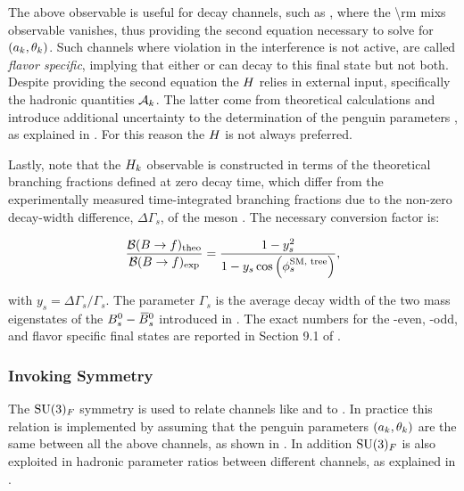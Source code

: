 \noindent The above observable is useful for decay channels, such as \BsJpsiKst, where the \Acp{\rm mix} observable vanishes,
thus providing the second equation necessary to solve for $(a_k,\theta_k)$. Such channels
where \CP violation in the interference is not active, are called {\it flavor specific}, implying
that either \Bs or \Bsb can decay to this final state but not both.
Despite providing the second equation the $H_{}$ relies in external input, specifically the hadronic quantities $\mathcal{A}_{k}$.
The latter come from theoretical calculations and introduce additional uncertainty to the determination of the penguin parameters
, as explained in . For this reason the $H_{}$ is not always preferred.

Lastly, note that the $H_{k}$ observable is constructed in terms of the theoretical branching fractions
defined at zero decay time, which differ from the experimentally measured time-integrated branching fractions \cite{DeBruyn:2012wj}
due to the non-zero decay-width difference, $\Delta\Gamma_s$, of the \Bs meson \cite{hfag-2014}.
The necessary conversion factor is:

\begin{equation}
  \centering
  \frac{\BRof{\B\to f}_{\rm theo}}{\BRof{\B\to f}_{\rm exp}} = \frac{1-y_s^2}{1-y_s\cos\parenthesis{\phiS{\rm SM, tree}}},
  \label{br_conversion_formula}
\end{equation}

\noindent with $y_s = \Delta\Gamma_s / \Gamma_s$. The parameter $\Gamma_s$ is the average decay width of the two
mass eigenstates of the $B^0_s-\kern 0.18em\overline{\kern -0.18em B}{}^0_s$ introduced in . The exact numbers for the \CP-even,
\CP-odd, and flavor specific final states are reported in Section 9.1 of \cite{bsjpsikst-paper}.

\subsubsection{Invoking \grpsuthree Symmetry}
The $\mathrm{SU}(3)_{F}$ symmetry is used to relate channels like \BsJpsiKst and \BsJpsiRho to \BsJpsiPhi.
In practice this relation is implemented by assuming that the penguin parameters $(a_k,\theta_k)$
are the same between all the above channels, as shown in . In addition $\mathrm{SU}(3)_{F}$
is also exploited in hadronic parameter ratios between different channels, as explained in .
